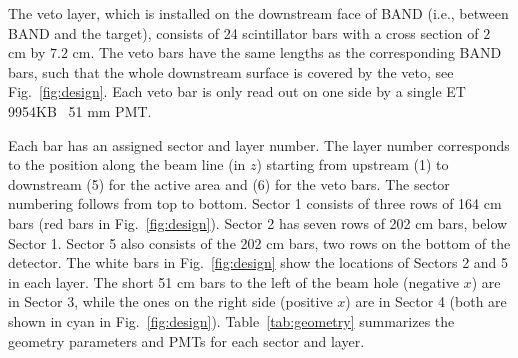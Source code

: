 \documentclass[3p,final,twocolumn]{elsarticle}
\begin{document}
The veto layer, which is installed on the downstream face of BAND
(i.e., between BAND and the target),
consists of 24 scintillator bars with a cross section of $2$
\si{\centi\meter} by $7.2$ \si{\centi\meter}. The veto bars have the
same lengths as the corresponding BAND bars, such that the whole
downstream surface is covered by the veto, see
Fig.~\ref{fig:design}. Each veto bar is only read out on one side by a
single ET 9954KB~\cite{pmt9954} 51 \si{\milli\meter} PMT.

Each bar has an assigned sector and layer number. The layer number
corresponds to the position along the beam line (in $z$) starting
from upstream (1) to downstream (5) for the active area and (6) for
the veto bars. The sector numbering follows from top to bottom. Sector 1 
consists of three rows of 164 \si{\centi\meter} bars (red bars in Fig.~\ref{fig:design}). 
Sector 2 has seven rows of 202 \si{\centi\meter} bars, below Sector 1. Sector 5 also 
consists of the 202 \si{\centi\meter} bars, two rows on the bottom of the detector. 
The white bars in Fig.~\ref{fig:design} show the locations of Sectors 2 and 
5 in each layer. The short 51 \si{\centi\meter} bars to the left of the beam hole (negative $x$) are in Sector 3, while the ones on the right side (positive $x$) 
are in Sector 4 (both are shown in cyan in Fig.~\ref{fig:design}). 
Table~\ref{tab:geometry} summarizes the geometry parameters 
and PMTs for each sector and layer.
\end{document}
